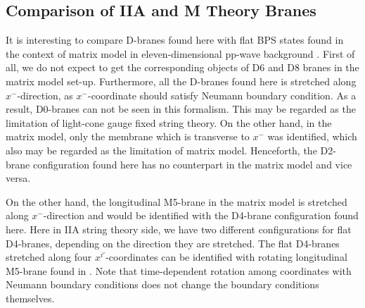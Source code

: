 \documentclass[a4paper,12pt]{article}
\begin{document}
\subsection{Comparison of IIA and M Theory Branes} 
It is interesting to compare D-branes found here with flat BPS states found 
in the context of matrix model in eleven-dimensional pp-wave background
\cite{hyu090}.
First of all, we do not expect to get the corresponding objects of 
D6 and D8 branes in the
matrix model set-up\cite{ban157}. 
Furthermore, all the D-branes found here is stretched along 
$x^-$-direction, as $x^-$-coordinate should satisfy Neumann boundary 
condition. As a result, D0-branes can not be seen in this formalism.
This may be regarded as the limitation of light-cone gauge fixed 
string theory. On the other hand, in the matrix model, only the
 membrane which is transverse to $x^-$ was identified, which 
also may be regarded 
as the limitation of matrix model. Henceforth, the D2-brane configuration 
found here has no counterpart in the matrix model and vice versa. 

On the 
other hand, the longitudinal M5-brane in the matrix model 
is stretched along
$x^-$-direction and would be identified with the D4-brane configuration 
found here. Here in IIA string theory side, 
we have two different configurations for flat D4-branes, 
depending on the direction they are stretched.      
The flat D4-branes stretched along four $x^{i'}$-coordinates can be 
identified with rotating longitudinal M5-brane found in \cite{hyu090}. Note 
that time-dependent rotation among coordinates with Neumann boundary 
conditions does not change the boundary conditions themselves. 
\end{document}
